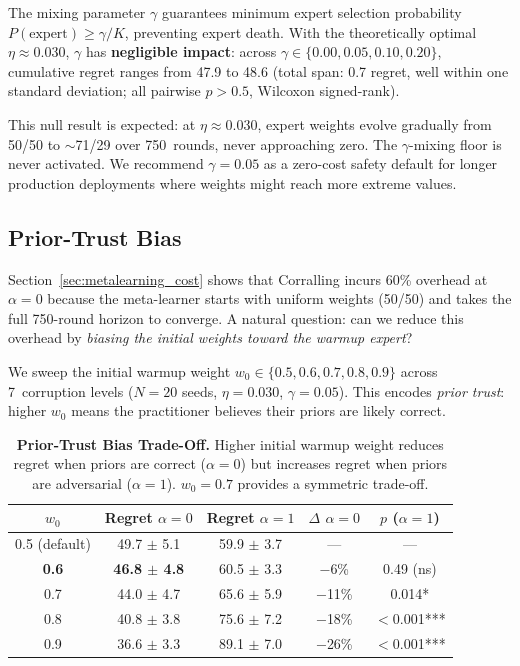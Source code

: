 The mixing parameter $\gamma$ guarantees minimum expert selection
probability $P(\text{expert}) \geq \gamma/K$, preventing expert death.
With the theoretically optimal $\eta{\approx}0.030$, $\gamma$ has
\textbf{negligible impact}: across
$\gamma \in \{0.00, 0.05, 0.10, 0.20\}$, cumulative regret ranges
from 47.9 to 48.6 (total span: 0.7 regret, well within one standard
deviation; all pairwise $p{>}0.5$, Wilcoxon signed-rank).

This null result is expected: at $\eta{\approx}0.030$, expert weights
evolve gradually from 50/50 to ${\sim}$71/29 over 750~rounds, never
approaching zero.  The $\gamma$-mixing floor is never activated.
We recommend $\gamma{=}0.05$ as a zero-cost safety default for longer
production deployments where weights might reach more extreme values.


\subsection{Prior-Trust Bias}
\label{app:initial_weight}

Section~\ref{sec:metalearning_cost} shows that Corralling incurs 60\%
overhead at $\alpha{=}0$ because the meta-learner starts with uniform
weights (50/50) and takes the full 750-round horizon to converge.
A natural question: can we reduce this overhead by \emph{biasing the
initial weights toward the warmup expert}?

We sweep the initial warmup weight $w_0 \in \{0.5, 0.6, 0.7, 0.8, 0.9\}$
across 7~corruption levels ($N{=}20$ seeds, $\eta{=}0.030$,
$\gamma{=}0.05$).  This encodes \emph{prior trust}: higher $w_0$
means the practitioner believes their priors are likely correct.

\begin{table}[h]
\centering
\caption{%
    \textbf{Prior-Trust Bias Trade-Off.}
    Higher initial warmup weight reduces regret when priors are correct
    ($\alpha{=}0$) but increases regret when priors are adversarial
    ($\alpha{=}1$).  $w_0{=}0.7$ provides a symmetric trade-off.
}
\label{tab:initial_weight}
\small
\begin{tabular}{@{}ccccc@{}}
\toprule
\textbf{$w_0$} & \textbf{Regret $\alpha{=}0$} & \textbf{Regret $\alpha{=}1$} &
\textbf{$\Delta$ $\alpha{=}0$} & \textbf{$p$ ($\alpha{=}1$)} \\
\midrule
0.5 (default) & 49.7 $\pm$ 5.1 & 59.9 $\pm$ 3.7 & --- & --- \\
\textbf{0.6} & \textbf{46.8 $\pm$ 4.8} & 60.5 $\pm$ 3.3 & $-$6\% & 0.49 (ns) \\
0.7 & 44.0 $\pm$ 4.7 & 65.6 $\pm$ 5.9 & $-$11\% & 0.014* \\
0.8 & 40.8 $\pm$ 3.8 & 75.6 $\pm$ 7.2 & $-$18\% & $<$0.001*** \\
0.9 & 36.6 $\pm$ 3.3 & 89.1 $\pm$ 7.0 & $-$26\% & $<$0.001*** \\
\bottomrule
\end{tabular}
\end{table}

